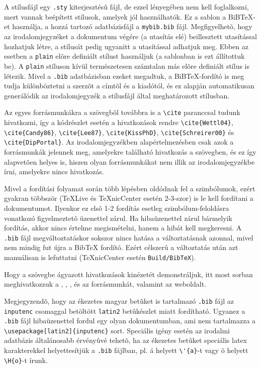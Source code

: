 A stílusfájl egy \verb+.sty+ kiterjesztésû fájl, de ezzel lényegében nem kell foglalkozni, mert vannak beépített stílusok, amelyek jól használhatók. Ez a sablon a BiB\TeX-et használja, a hozzá tartozó adatbázisfájl a \verb+mybib.bib+ fájl. Megfigyelhetõ, hogy az irodalomjegyzéket a dokumentum végére (a \verb++ utasítás elé) beillesztett \verb++ utasítással hozhatjuk létre, a stílusát pedig ugyanitt a  \verb++ utasítással adhatjuk meg. Ebben az esetben a \verb+plain+ elõre definiált stílust használjuk (a sablonban is ezt állítottuk be). A \verb+plain+ stíluson kívül természetesen számtalan más elõre definiált stílus is létezik. Mivel a \verb+.bib+ adatbázisban ezeket megadtuk, a BiB\TeX-fordító is meg tudja különböztetni a szerzõt a címtõl és a kiadótól, és ez alapján automatikusan generálódik az irodalomjegyzék a stílusfájl által meghatározott stílusban.

Az egyes forrásmunkákra a szövegbõl továbbra is a \verb+\cite+ paranccsal tudunk hivatkozni, így a  kódrészlet esetén a hivatkozások rendre \verb+\cite{Wettl04}+, \verb+\cite{Candy86}+, \verb+\cite{Lee87}+, \verb+\cite{KissPhD}+, \verb+\cite{Schreirer00}+ és \verb+\cite{DipPortal}+. Az irodalomjegyzékben alapértelmezésben csak azok a forrásmunkák jelennek meg, amelyekre található hivatkozás a szövegben, és ez így alapvetõen helyes is, hiszen olyan forrásmunkákat nem illik az irodalomjegyzékbe írni, amelyekre nincs hivatkozás.

Mivel a fordítási folyamat során több lépésben oldódnak fel a szimbólumok, ezért gyakran többször (TeXLive és TeXnicCenter esetén 2-3-szor) is le kell fordítani a dokumentumot. Ilyenkor ez elsõ 1-2 fordítás esetleg szimbólum-feloldásra vonatkozó figyelmeztetõ üzenettel zárul. Ha hibaüzenettel zárul bármelyik fordítás, akkor nincs értelme megismételni, hanem a hibát kell megkeresni. A \verb+.bib+ fájl megváltoztatáskor sokszor nincs hatása a változtatásnak azonnal, mivel nem mindig fut újra a BibTeX fordító. Ezért célszerû a változtatás után azt manuálisan is lefuttatni (TeXnicCenter esetén \verb+Build/BibTeX+).

Hogy a szövegbe ágyazott hivatkozások kinézetét demonstráljuk, itt most sorban meghivatkozzuk a \cite{Wettl04}, \cite{Candy86}, \cite{Lee87}, \cite{KissPhD} és az \cite{Schreier00} forrásmunkát, valamint az \cite{DipPortal} weboldalt.

Megjegyzendõ, hogy az ékezetes magyar betûket is tartalmazó \verb+.bib+ fájl az \verb+inputenc+ csomaggal betöltött \verb+latin2+ betûkészlet miatt fordítható. Ugyanez a \verb+.bib+ fájl hibaüzenettel fordul egy olyan dokumentumban, ami nem tartalmazza a \verb+\usepackage[latin2]{inputenc}+ sort. Speciális igény esetén az irodalmi adatbázis általánosabb érvényûvé tehetõ, ha az ékezetes betûket speciális latex karakterekkel helyettesítjük a \verb+.bib+ fájlban, pl. á helyett \verb+\'{a}+-t vagy õ helyett \verb+\H{o}+-t írunk. 

